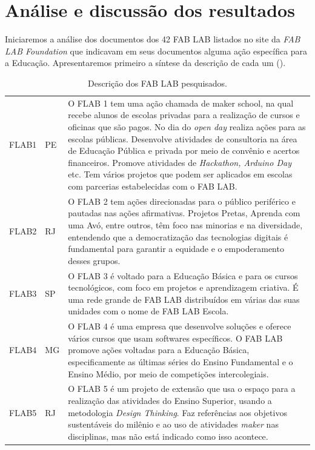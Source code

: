 \documentclass[portuguese]{textolivre}
\begin{document}
\section{Análise e discussão dos resultados}\label{sec-fmt-manuscrito}
Iniciaremos a análise dos documentos dos 42 FAB LAB listados no site da \textit{FAB LAB Foundation} que indicavam em seus documentos alguma ação específica para a Educação. Apresentaremos primeiro a síntese da descrição de cada um ().

\begin{footnotesize}
\begin{longtable}{p{1cm} p{1cm} p{11.5cm}}
\caption{Descrição dos FAB LAB pesquisados.}
\label{tbl2}
\\
\toprule
FLAB1 & PE & O FLAB 1 tem uma ação chamada de maker school, na qual recebe alunos de escolas privadas para a realização de cursos e oficinas que são pagos. No dia do \textit{open day} realiza ações para as escolas públicas. Desenvolve atividades de consultoria na área de Educação Pública e privada por meio de convênio e acertos financeiros. Promove atividades de \textit{Hackathon, Arduino Day} etc. Tem vários projetos que podem ser aplicados em escolas com parcerias estabelecidas com o FAB LAB. \\
FLAB2 & RJ & O FLAB 2 tem ações direcionadas para o público periférico e pautadas nas ações afirmativas. Projetos Pretas, Aprenda com uma Avó, entre outros, têm foco nas minorias e na diversidade, entendendo que a democratização das tecnologias digitais é fundamental para garantir a equidade e o empoderamento desses grupos. \\
FLAB3 & SP & O FLAB 3 é voltado para a Educação Básica e para os cursos tecnológicos, com foco em projetos e aprendizagem criativa. É uma rede grande de FAB LAB distribuídos em várias das suas unidades com o nome de FAB LAB Escola. \\
FLAB4 & MG & O FLAB 4 é uma empresa que desenvolve soluções e oferece vários cursos que usam softwares específicos. O FAB LAB promove ações voltadas para a Educação Básica, especificamente as últimas séries do Ensino Fundamental e o Ensino Médio, por meio de competições intercolegiais. \\
FLAB5 & RJ & O FLAB 5 é um projeto de extensão que usa o espaço para a realização das atividades do Ensino Superior, usando a metodologia \textit{Design Thinking}. Faz referências aos objetivos sustentáveis do milênio e ao uso de atividades \textit{maker} nas disciplinas, mas não está indicado como isso acontece. \\

\end{longtable}
\end{footnotesize}
\end{document}
